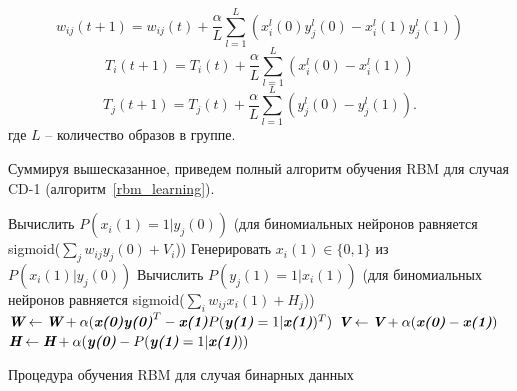 \begin{equation*}
		w_{ij}(t+1)=w_{ij}(t)+\frac{\alpha}{L}\sum_{l=1}^L(x_i^l(0)y_j^l(0)-x_i^l(1)y_j^l(1))
\end{equation*}
\begin{equation*}		
		T_i(t+1)=T_i(t)+\frac{\alpha}{L}\sum_{l=1}^L(x_i^l(0)-x_i^l(1))
\end{equation*}
\begin{equation*}		
		T_j(t+1)=T_j(t)+\frac{\alpha}{L}\sum_{l=1}^L(y_j^l(0)-y_j^l(1)).
\end{equation*}	
где $L$ -- количество образов в группе.
	
Суммируя вышесказанное, приведем полный алгоритм обучения RBM для случая CD-1 (алгоритм~\ref{rbm_learning}).

\begin{algo}[h]
	
	{
		Вычислить $P(x_{i}(1)=1|y_j(0))$ (для биномиальных нейронов равняется sigmoid($\sum_{j}{w_{ij}y_{j}(0)} + V_i$))\;
		Генерировать $x_{i}(1) \in \{0, 1\}$ из $P(x_{i}(1)|y_j(0))$\;
	}	
	{
		Вычислить $P(y_{j}(1)=1|x_i(1))$ (для биномиальных нейронов равняется sigmoid($\sum_{i}{w_{ij}x_{i}(1)} + H_j$))\;
	}
	$\textit{\textbf{W}} \leftarrow \textit{\textbf{W}} + \alpha(\textbf{\textit{x(0)}}\textit{\textbf{y(0)}}^T - \textit{\textbf{x(1)}}P(\textit{\textbf{y(1)}}=1|\textit{\textbf{x(1)}})^T)$\;
	$\textit{\textbf{V}} \leftarrow \textit{\textbf{V}} + \alpha(\textit{\textbf{x(0)}} - \textit{\textbf{x(1)}})$\;
	$\textit{\textbf{H}} \leftarrow \textit{\textbf{H}} + \alpha(\textit{\textbf{y(0)}} - P(\textit{\textbf{y(1)}}=1|\textit{\textbf{x(1)}}))$\;
    \caption{Процедура обучения RBM для случая бинарных данных}
	\label{rbm_learning}
\end{algo}

